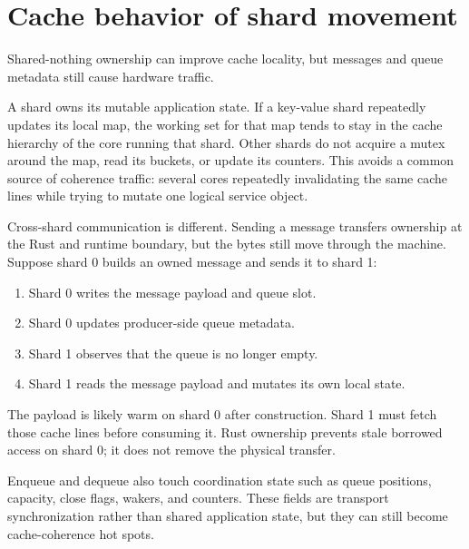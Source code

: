 \section{Cache behavior of shard movement}

Shared-nothing ownership can improve cache locality, but messages and queue
metadata still cause hardware traffic.

A shard owns its mutable application state. If a key-value shard repeatedly
updates its local map, the working set for that map tends to stay in the cache
hierarchy of the core running that shard. Other shards do not acquire a mutex
around the map, read its buckets, or update its counters. This avoids a common
source of coherence traffic: several cores repeatedly invalidating the same
cache lines while trying to mutate one logical service object.

Cross-shard communication is different. Sending a message transfers ownership
at the Rust and runtime boundary, but the bytes still move through the machine.
Suppose shard 0 builds an owned message and sends it to shard 1:

\begin{enumerate}
    \item Shard 0 writes the message payload and queue slot.
    \item Shard 0 updates producer-side queue metadata.
    \item Shard 1 observes that the queue is no longer empty.
    \item Shard 1 reads the message payload and mutates its own local state.
\end{enumerate}

The payload is likely warm on shard 0 after construction. Shard 1 must fetch
those cache lines before consuming it. Rust ownership prevents stale borrowed
access on shard 0; it does not remove the physical transfer.

Enqueue and dequeue also touch coordination state such as queue positions,
capacity, close flags, wakers, and counters. These fields are transport
synchronization rather than shared application state, but they can still
become cache-coherence hot spots.

